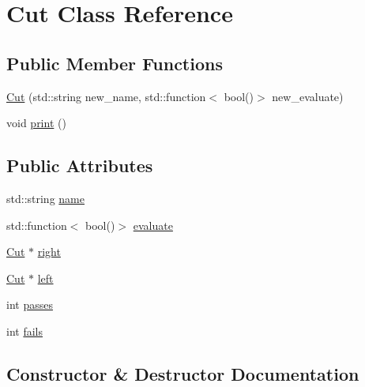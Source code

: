 \hypertarget{classCut}{}\section{Cut Class Reference}
\label{classCut}
\subsection*{Public Member Functions}
\begin{DoxyCompactItemize}
\item 
\hyperlink{classCut_aaa89435c5326080296041bc38937ab2d}{Cut} (std\+::string new\+\_\+name, std\+::function$<$ bool()$>$ new\+\_\+evaluate)
\item 
void \hyperlink{classCut_a9b1298219ed1f85bba920e4049d712e3}{print} ()
\end{DoxyCompactItemize}
\subsection*{Public Attributes}
\begin{DoxyCompactItemize}
\item 
std\+::string \hyperlink{classCut_accf700d2d00746b97a265d4aea3f55c2}{name}
\item 
std\+::function$<$ bool()$>$ \hyperlink{classCut_a4205ad5e62b859536797141f3ace2253}{evaluate}
\item 
\hyperlink{classCut}{Cut} $\ast$ \hyperlink{classCut_a2142ffe68028bb0c211408c0f5bb8bfb}{right}
\item 
\hyperlink{classCut}{Cut} $\ast$ \hyperlink{classCut_a2c65e372172dfa0f705d117d3ad0f668}{left}
\item 
int \hyperlink{classCut_a9ec802667c770787a473c622208ef35c}{passes}
\item 
int \hyperlink{classCut_a7bfcec46b8c2879a9660ac7656ed7b83}{fails}
\end{DoxyCompactItemize}


\subsection{Constructor \& Destructor Documentation}
